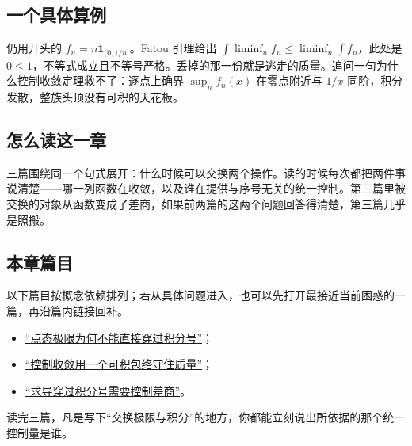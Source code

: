 \subsection{一个具体算例}

仍用开头的 \(f_n=n\mathbf1_{(0,1/n]}\)。Fatou 引理给出 \(\int\liminf_n f_n\le\liminf_n\int f_n\)，此处是 \(0\le1\)，不等式成立且不等号严格。丢掉的那一份就是逃走的质量。追问一句为什么控制收敛定理救不了：逐点上确界 \(\sup_n f_n(x)\) 在零点附近与 \(1/x\) 同阶，积分发散，整族头顶没有可积的天花板。

\subsection{怎么读这一章}

三篇围绕同一个句式展开：什么时候可以交换两个操作。读的时候每次都把两件事说清楚——哪一列函数在收敛，以及谁在提供与序号无关的统一控制。第三篇里被交换的对象从函数变成了差商，如果前两篇的这两个问题回答得清楚，第三篇几乎是照搬。

\subsection{本章篇目}

以下篇目按概念依赖排列；若从具体问题进入，也可以先打开最接近当前困惑的一篇，再沿篇内链接回补。

\begin{itemize}
\tightlist
\item \hyperref[sec:12-Real-Analysis-Support/04-Limits-and-Integration/01]{``点态极限为何不能直接穿过积分号''}；
\item \hyperref[sec:12-Real-Analysis-Support/04-Limits-and-Integration/02]{``控制收敛用一个可积包络守住质量''}；
\item \hyperref[sec:12-Real-Analysis-Support/04-Limits-and-Integration/03]{``求导穿过积分号需要控制差商''}。
\end{itemize}

读完三篇，凡是写下``交换极限与积分''的地方，你都能立刻说出所依据的那个统一控制量是谁。
